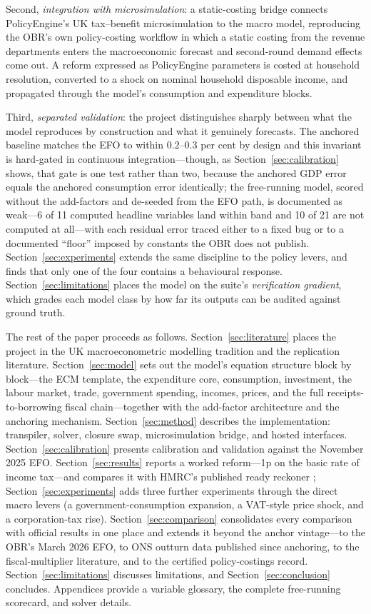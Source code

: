 Second, \emph{integration with microsimulation}: a static-costing bridge connects PolicyEngine's UK tax--benefit microsimulation \citep{policyengine} to the macro model, reproducing the OBR's own policy-costing workflow \citep{obr2014costings} in which a static costing from the revenue departments enters the macroeconomic forecast and second-round demand effects come out. A reform expressed as PolicyEngine parameters is costed at household resolution, converted to a shock on nominal household disposable income, and propagated through the model's consumption and expenditure blocks.

Third, \emph{separated validation}: the project distinguishes sharply between what the model reproduces by construction and what it genuinely forecasts. The anchored baseline matches the EFO to within 0.2--0.3 per cent by design and this invariant is hard-gated in continuous integration---though, as Section~\ref{sec:calibration} shows, that gate is one test rather than two, because the anchored GDP error equals the anchored consumption error identically; the free-running model, scored without the add-factors and de-seeded from the EFO path, is documented as weak---6 of 11 computed headline variables land within band and 10 of 21 are not computed at all---with each residual error traced either to a fixed bug or to a documented ``floor'' imposed by constants the OBR does not publish. Section~\ref{sec:experiments} extends the same discipline to the policy levers, and finds that only one of the four contains a behavioural response. Section~\ref{sec:limitations} places the model on the suite's \emph{verification gradient}, which grades each model class by how far its outputs can be audited against ground truth.

The rest of the paper proceeds as follows. Section~\ref{sec:literature} places the project in the UK macroeconometric modelling tradition and the replication literature. Section~\ref{sec:model} sets out the model's equation structure block by block---the ECM template, the expenditure core, consumption, investment, the labour market, trade, government spending, incomes, prices, and the full receipts-to-borrowing fiscal chain---together with the add-factor architecture and the anchoring mechanism. Section~\ref{sec:method} describes the implementation: transpiler, solver, closure swap, microsimulation bridge, and hosted interfaces. Section~\ref{sec:calibration} presents calibration and validation against the November 2025 EFO. Section~\ref{sec:results} reports a worked reform---1p on the basic rate of income tax---and compares it with HMRC's published ready reckoner \citep{hmrc2025reckoner}; Section~\ref{sec:experiments} adds three further experiments through the direct macro levers (a government-consumption expansion, a VAT-style price shock, and a corporation-tax rise). Section~\ref{sec:comparison} consolidates every comparison with official results in one place and extends it beyond the anchor vintage---to the OBR's March 2026 EFO, to ONS outturn data published since anchoring, to the fiscal-multiplier literature, and to the certified policy-costings record. Section~\ref{sec:limitations} discusses limitations, and Section~\ref{sec:conclusion} concludes. Appendices provide a variable glossary, the complete free-running scorecard, and solver details.
